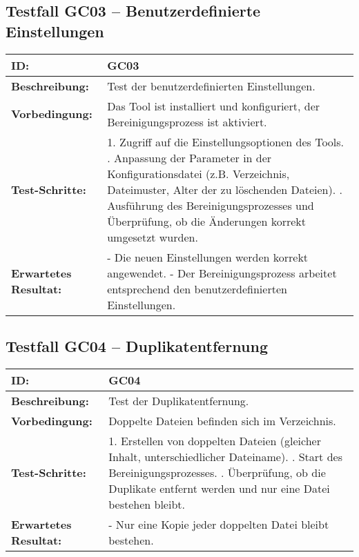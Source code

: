\vspace{1em}

\subsection*{Testfall GC03 – Benutzerdefinierte Einstellungen}
\begin{tabular}{|p{4cm}|p{10cm}|}
\hline
\textbf{ID:} & GC03 \\
\hline
\textbf{Beschreibung:} & Test der benutzerdefinierten Einstellungen. \\
\hline
\textbf{Vorbedingung:} & Das Tool ist installiert und konfiguriert, der Bereinigungsprozess ist aktiviert. \\
\hline
\textbf{Test-Schritte:} & 
1. Zugriff auf die Einstellungsoptionen des Tools. \newline
2. Anpassung der Parameter in der Konfigurationsdatei (z.B. Verzeichnis, Dateimuster, Alter der zu löschenden Dateien). \newline
3. Ausführung des Bereinigungsprozesses und Überprüfung, ob die Änderungen korrekt umgesetzt wurden. \\
\hline
\textbf{Erwartetes \newline Resultat:} & 
- Die neuen Einstellungen werden korrekt angewendet. \newline
- Der Bereinigungsprozess arbeitet entsprechend den benutzerdefinierten Einstellungen. \\
\hline
\end{tabular}

\vspace{1em}

\subsection*{Testfall GC04 – Duplikatentfernung}
\begin{tabular}{|p{4cm}|p{10cm}|}
\hline
\textbf{ID:} & GC04 \\
\hline
\textbf{Beschreibung:} & Test der Duplikatentfernung. \\
\hline
\textbf{Vorbedingung:} & Doppelte Dateien befinden sich im Verzeichnis. \\
\hline
\textbf{Test-Schritte:} & 
1. Erstellen von doppelten Dateien (gleicher Inhalt, unterschiedlicher Dateiname). \newline
2. Start des Bereinigungsprozesses. \newline
3. Überprüfung, ob die Duplikate entfernt werden und nur eine Datei bestehen bleibt. \\
\hline
\textbf{Erwartetes \newline Resultat:} & 
- Nur eine Kopie jeder doppelten Datei bleibt bestehen. \\
\hline
\end{tabular}


